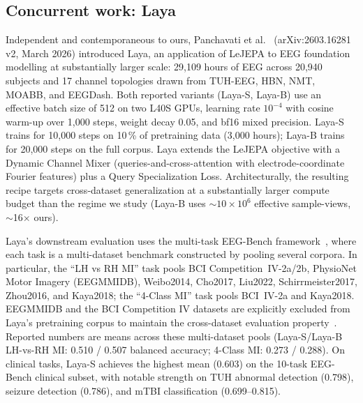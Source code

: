 \subsection{Concurrent work: Laya}

Independent and contemporaneous to ours, Panchavati et
al.~\cite{laya2026} (arXiv:2603.16281\,v2, March 2026) introduced Laya, an
application of LeJEPA to EEG foundation modelling at substantially larger
scale: 29{,}109 hours of EEG across 20{,}940 subjects and 17 channel
topologies drawn from TUH-EEG, HBN, NMT, MOABB, and EEGDash. Both reported
variants (Laya-S, Laya-B) use an effective batch size of 512 on two L40S
GPUs, learning rate $10^{-4}$ with cosine warm-up over 1{,}000 steps, weight
decay 0.05, and bf16 mixed precision. Laya-S trains for 10{,}000 steps on
10\,\% of pretraining data (3{,}000 hours); Laya-B trains for 20{,}000 steps
on the full corpus. Laya extends the LeJEPA objective with a Dynamic Channel
Mixer (queries-and-cross-attention with electrode-coordinate Fourier
features) plus a Query Specialization Loss. Architecturally, the resulting
recipe targets cross-dataset generalization at a substantially larger
compute budget than the regime we study (Laya-B uses
$\sim$$10\times 10^6$ effective sample-views, $\sim$16$\times$ ours).

Laya's downstream evaluation uses the multi-task EEG-Bench
framework~\cite{eegbench2025}, where each task is a multi-dataset benchmark
constructed by pooling several corpora. In particular, the
``LH vs RH MI'' task pools BCI Competition~IV-2a/2b, PhysioNet Motor Imagery
(EEGMMIDB), Weibo2014, Cho2017, Liu2022, Schirrmeister2017, Zhou2016, and
Kaya2018; the ``4-Class MI'' task pools BCI~IV-2a and Kaya2018. EEGMMIDB and
the BCI Competition IV datasets are explicitly excluded from Laya's
pretraining corpus to maintain the cross-dataset evaluation
property~\cite[Sec.~4]{laya2026}. Reported numbers
\cite[Tab.~1]{laya2026} are means across these multi-dataset pools
(Laya-S/Laya-B LH-vs-RH MI: 0.510 / 0.507 balanced accuracy; 4-Class MI:
0.273 / 0.288). On clinical tasks, Laya-S achieves the highest mean (0.603)
on the 10-task EEG-Bench clinical subset, with notable strength on TUH
abnormal detection (0.798), seizure detection (0.786), and mTBI
classification (0.699--0.815).

